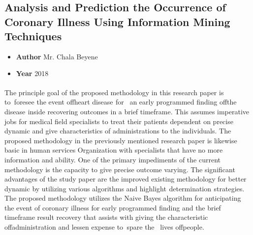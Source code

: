 \documentclass[oneside,12pt]{Classes/VTU}
\begin{document}
    \subsection{Analysis and Prediction the Occurrence of Coronary Illness Using Information Mining Techniques}
    \begin{itemize}
    	\item \textbf{Author} Mr. Chala Beyene
    	\item \textbf{Year} 2018
    \end{itemize}
    \paragraph{}
    The principle goal of the proposed methodology in this research paper is to\tiny\textcolor{white}{o}\normalsize foresee the event of\tiny\textcolor{white}{f}\normalsize heart disease\tiny\textcolor{white}{s}\normalsize for\tiny\textcolor{white}{m}\normalsize an early programmed finding of\tiny\textcolor{white}{f}\normalsize the disease\tiny\textcolor{white}{s}\normalsize inside recovering outcomes in a brief timeframe. This assumes imperative jobs for medical field specialists to treat their patients dependent on precise dynamic and give characteristics of administrations to the individuals. The proposed methodology in the previously mentioned research paper is likewise basic in human services Organization with specialists that have no more information and ability. One of the primary impediments of the current methodology is the capacity to give precise outcome varying. The significant advantages of the study paper are the improved existing methodology for better dynamic by utilizing various algorithms and highlight\tiny\textcolor{white}{s}\normalsize determination\tiny\textcolor{white}{s}\normalsize strategies. The proposed methodology utilizes the Naive Bayes algorithm for anticipating the event of coronary illness for early programmed finding and the brief timeframe result recovery that assists with giving the characteristic of\tiny\textcolor{white}{f}\normalsize administration and lessen expense to\tiny\textcolor{white}{o}\normalsize spare the\tiny\textcolor{white}{m}\normalsize lives of\tiny\textcolor{white}{f}\normalsize people.
    
\end{document}
